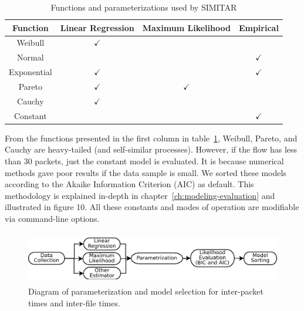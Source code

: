 \begin{table}[ht!]
	\centering
	\caption{Functions and parameterizations used by SIMITAR}
		\begin{tabular}{c c c c}
			\toprule
			\textbf{Function} & Linear Regression & Maximum Likelihood & Empirical\footnotemark \\
			\midrule
			Weibull         & $\checkmark$    &                  &                  \\
			Normal             &                  &                  &  $\checkmark$    \\
			Exponential      & $\checkmark$    &                  &  $\checkmark$    \\
			Pareto          & $\checkmark$    & $\checkmark$    &                  \\
			Cauchy          & $\checkmark$    &                  &                  \\
			Constant          &                 &                  & $\checkmark$    \\
			\bottomrule
		\end{tabular}
		\label{tab:parameterizations-sumary}
\end{table}


From the functions presented in the first column in table~\ref{tab:parameterizations-sumary}, Weibull, Pareto, and Cauchy are heavy-tailed (and self-similar processes). However, if the flow has less than 30 packets, just the constant model is evaluated. It is because numerical methods gave poor results if the data sample is small. We sorted these models according to the Akaike Information Criterion (AIC) as default\cite{sourcesonoff-paper}\cite{bic-aic-comparision}. This methodology is explained in-depth in chapter~\ref{ch:modeling-evaluation} and illustrated in figure 10.  All these constants and modes of operation are modifiable via command-line options.

\begin{figure}[ht!]
    \centering
    \includegraphics[height=0.9in]{figures/ch3/simitar-parametrization}
    \caption{Diagram of parameterization and model selection for inter-packet times and inter-file times.}
    \label{fig:model-parameterization}
\end{figure}

